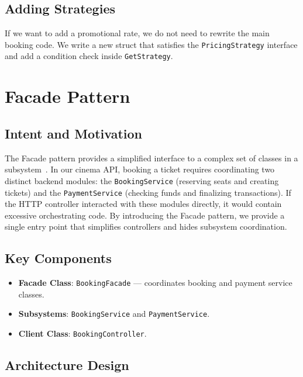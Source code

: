 \documentclass[conference]{IEEEtran}
\begin{document}
\subsection{Adding Strategies}

If we want to add a promotional rate, we do not need to rewrite the main booking code. We write a new struct that satisfies the \texttt{PricingStrategy} interface and add a condition check inside \texttt{GetStrategy}.

\section{Facade Pattern}
\label{sec:facade}

\subsection{Intent and Motivation}

The Facade pattern provides a simplified interface to a complex set of classes in a subsystem~\cite{gamma1994design}. In our cinema API, booking a ticket requires coordinating two distinct backend modules: the \texttt{BookingService} (reserving seats and creating tickets) and the \texttt{PaymentService} (checking funds and finalizing transactions). If the HTTP controller interacted with these modules directly, it would contain excessive orchestrating code. By introducing the Facade pattern, we provide a single entry point that simplifies controllers and hides subsystem coordination.

\subsection{Key Components}

\begin{itemize}
  \item \textbf{Facade Class}: \texttt{BookingFacade} --- coordinates booking and payment service classes.
  \item \textbf{Subsystems}: \texttt{BookingService} and \texttt{PaymentService}.
  \item \textbf{Client Class}: \texttt{BookingController}.
\end{itemize}

\subsection{Architecture Design}
\end{document}
